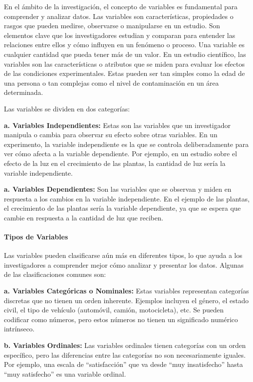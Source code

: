 \documentclass[
  11pt,
  bookmarksnumbered]{article}
\begin{document}
En el ámbito de la investigación, el concepto de variables es fundamental para comprender y analizar datos.
Las variables son características, propiedades o rasgos que pueden medirse, observarse o manipularse en un estudio.
Son elementos clave que los investigadores estudian y comparan para entender las relaciones entre ellos y cómo influyen en un fenómeno o proceso.
Una variable es cualquier cantidad que pueda tener más de un valor.
En un estudio científico, las variables son las características o atributos que se miden para evaluar los efectos de las condiciones experimentales.
Estas pueden ser tan simples como la edad de una persona o tan complejas como el nivel de contaminación en un área determinada.

Las variables se dividen en dos categorías:

\textbf{a. Variables Independientes:} Estas son las variables que un investigador manipula o cambia para observar su efecto sobre otras variables.
En un experimento, la variable independiente es la que se controla deliberadamente para ver cómo afecta a la variable dependiente.
Por ejemplo, en un estudio sobre el efecto de la luz en el crecimiento de las plantas, la cantidad de luz sería la variable independiente.

\textbf{a. Variables Dependientes:} Son las variables que se observan y miden en respuesta a los cambios en la variable independiente.
En el ejemplo de las plantas, el crecimiento de las plantas sería la variable dependiente, ya que se espera que cambie en respuesta a la cantidad de luz que reciben.

\hypertarget{tipos-de-variables}{%
\paragraph{Tipos de Variables}\label{tipos-de-variables}}

Las variables pueden clasificarse aún más en diferentes tipos, lo que ayuda a los investigadores a comprender mejor cómo analizar y presentar los datos.
Algunas de las clasificaciones comunes son:

\textbf{a. Variables Categóricas o Nominales:} Estas variables representan categorías discretas que no tienen un orden inherente.
Ejemplos incluyen el género, el estado civil, el tipo de vehículo (automóvil, camión, motocicleta), etc.
Se pueden codificar como números, pero estos números no tienen un significado numérico intrínseco.

\textbf{b. Variables Ordinales:} Las variables ordinales tienen categorías con un orden específico, pero las diferencias entre las categorías no son necesariamente iguales.
Por ejemplo, una escala de ``satisfacción'' que va desde ``muy insatisfecho'' hasta ``muy satisfecho'' es una variable ordinal.
\end{document}

